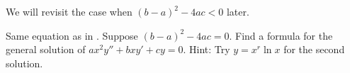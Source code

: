 \documentclass{ximera}
\begin{document}
We will revisit the case when ${(b-a)}^2-4ac < 0$ later.

\begin{exercise} \label{sol:eulerexln}
    Same equation as in . Suppose ${(b-a)}^2-4ac = 0$.  Find a formula for the general solution of $a x^2 y'' + b x y' + c y = 0$.  Hint: Try $y=x^r \ln x$ for the second solution.
\end{exercise}


\end{document}
